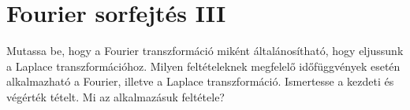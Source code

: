 \documentclass[../main.tex]{subfiles}
\begin{document}
\section{Fourier sorfejtés III}

\begin{fulltheorem}
	Mutassa be, hogy a Fourier transzformáció miként általánosítható,
	hogy eljussunk a Laplace transzformációhoz. Milyen feltételeknek megfelelő
	időfüggvények esetén alkalmazható a Fourier, illetve a Laplace transzformáció.
	Ismertesse a kezdeti és végérték tételt. Mi az alkalmazásuk feltétele?
\end{fulltheorem}
\end{document}

